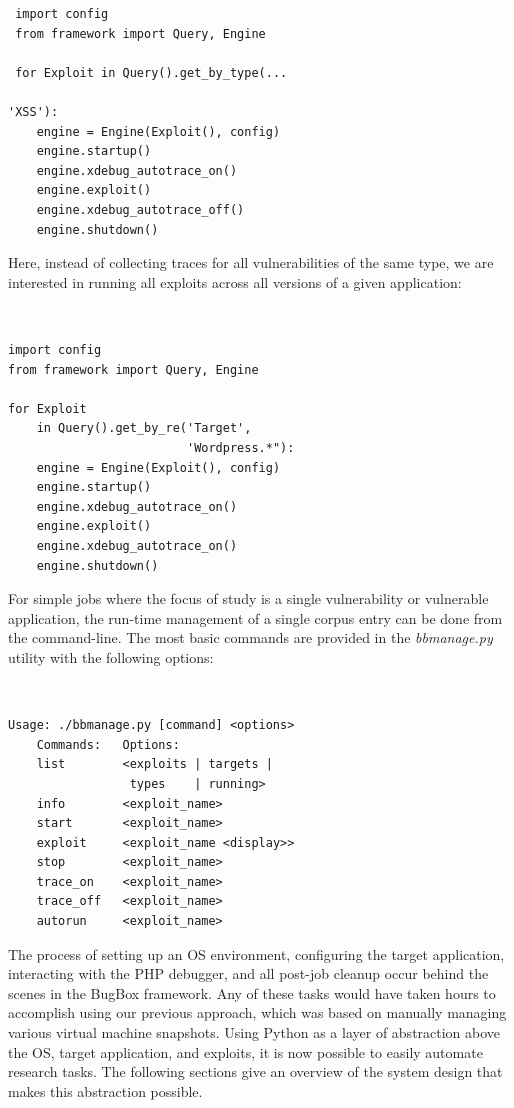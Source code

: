 \documentclass[letterpaper,twocolumn,10pt]{article}
\begin{document}
\begin{minipage}{\textwidth}
{\tt \footnotesize

\begin{lstlisting}
 import config
 from framework import Query, Engine
 
 for Exploit in Query().get_by_type(...
 																'XSS'):
    engine = Engine(Exploit(), config)
    engine.startup()
    engine.xdebug_autotrace_on()
    engine.exploit()
    engine.xdebug_autotrace_off()
    engine.shutdown()
\end{lstlisting}
}
\end{minipage}


Here, instead of collecting traces for all vulnerabilities of the same type, we are interested in running all exploits across all versions of a given application:

\begin{minipage}{\textwidth}
{\tt \footnotesize
\begin{lstlisting}
import config
from framework import Query, Engine

for Exploit 
    in Query().get_by_re('Target', 
                         'Wordpress.*"):
    engine = Engine(Exploit(), config)
    engine.startup()
    engine.xdebug_autotrace_on()
    engine.exploit()
    engine.xdebug_autotrace_on()
    engine.shutdown()
\end{lstlisting}
}
\end{minipage}

For simple jobs where the focus of study is a single vulnerability or vulnerable application, the run-time management of a single corpus entry can be done from the command-line. The most basic commands are provided in the \emph{bbmanage.py} utility with the following options:

{\tt \footnotesize
\begin{verbatim}
Usage: ./bbmanage.py [command] <options>
    Commands:   Options:
    list        <exploits | targets | 
                 types    | running>
    info        <exploit_name>
    start       <exploit_name>
    exploit     <exploit_name <display>>
    stop        <exploit_name>
    trace_on    <exploit_name>
    trace_off   <exploit_name>
    autorun     <exploit_name>
\end{verbatim}
}

The process of setting up an OS environment, configuring the target application, interacting with the PHP debugger, and all post-job cleanup occur behind the scenes in the BugBox framework. Any of these tasks would have taken hours to accomplish using our previous approach, which was based on manually managing various virtual machine snapshots. Using Python as a layer of abstraction above the OS, target application, and exploits, it is now possible to easily automate research tasks. The following sections give an overview of the system design that makes this abstraction possible.
\end{document}

